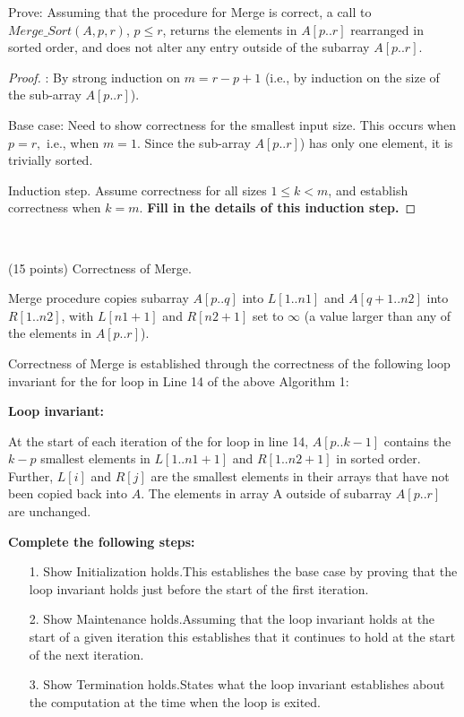 \documentclass[12pt]{article}
\newcommand{\vs}{\vspace{2mm}}
\begin{document}
Prove: Assuming that the procedure for Merge is correct, a call to $Merge\_Sort(A, p, r)$,
$p \leq r$, returns the elements in $A[p..r]$ rearranged in sorted order, and does not alter any entry
outside of the subarray $A[p..r].$

\begin{proof}:  By strong induction on $m = r - p + 1$ (i.e., by induction on the size of the
sub-array $A[p..r]$).

Base case: Need to show correctness for the smallest input size. This occurs when $p = r,$ i.e.,
when $m = 1.$ Since the
sub-array $A[p..r]$) has only one element, it is trivially sorted.

Induction step. Assume correctness for all sizes $1 \leq k < m$, and establish correctness when $k= m$. {\bf Fill in the details of this induction step.}
\end{proof}
\vs\
\pagebreak

 (15 points)
Correctness of Merge.

Merge procedure copies subarray $A[p..q]$ into $L[1..n1]$ and $A[q+1..n2]$ into $R[1..n2]$, with $L[n1+1]$
and $R[n2 + 1]$ set to $\infty$ (a value larger than any of the elements in $A[p..r]$).

Correctness of Merge is established through the correctness of the following loop
invariant for the for loop in Line 14 of the above Algorithm 1:

{\bf Loop invariant: } 

At the start of each iteration of the for loop in line 14, $A[p..k -1]$ contains the $k-p$ smallest
elements in $L[1..n1 + 1]$ and $R[1..n2 + 1]$ in sorted order. Further, $L[i]$ and $R[j]$ are the
smallest elements in their arrays that have not been copied back into $A.$ The elements in
array A outside of subarray $A[p..r]$ are unchanged.

{\bf Complete the following steps:}
\begin{itemize}
\item[1.]	Show Initialization holds.This establishes the base case by proving that the loop invariant holds just
before the start of the first iteration.
\item[2.]Show Maintenance  holds.Assuming that the loop invariant holds at the start of a given iteration this
establishes that it continues to hold at the start of the next iteration.

\item[3.]	Show Termination holds.States what the loop invariant establishes about the computation at the time
when the loop is exited.
\end{itemize}
\end{document}
